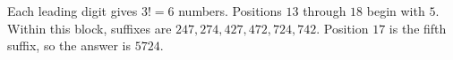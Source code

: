 Each leading digit gives $3!=6$ numbers. Positions $13$ through $18$ begin with $5$. Within this block, suffixes are $247,274,427,472,724,742$. Position $17$ is the fifth suffix, so the answer is $\boxed{5724}$.
